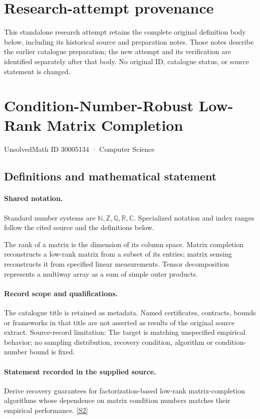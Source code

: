 \documentclass[11pt]{article}
\begin{document}
\section*{Research-attempt provenance}
This standalone research attempt retains the complete original definition body below,
including its historical source and preparation notes. Those notes describe the
earlier catalogue preparation; the new attempt and its verification are identified
separately after that body. No original ID, catalogue status, or source statement is changed.

\section{Condition-Number-Robust Low-Rank Matrix Completion}\label{30005134}
{\small UnsolvedMath ID 30005134 · Computer Science}
\subsection{Definitions and mathematical statement}

\paragraph{Shared notation.}Standard number systems are $\mathbb N,\mathbb Z,\mathbb Q,\mathbb R,\mathbb C$. Specialized notation and index ranges follow the cited source and the definitions below.


The rank of a matrix is the dimension of its column space. Matrix completion reconstructs a low-rank matrix from a subset of its entries; matrix sensing reconstructs it from specified linear measurements. Tensor decomposition represents a multiway array as a sum of simple outer products.
\paragraph{Record scope and qualifications.}
The catalogue title is retained as metadata. Named certificates, contracts, bounds or frameworks in that title are not asserted as results of the original source extract.
Source-record limitation: The target is matching unspecified empirical behavior; no sampling distribution, recovery condition, algorithm or condition-number bound is fixed.
\paragraph{Statement recorded in the supplied source.}
Derive recovery guarantees for factorization-based low-rank matrix-completion algorithms whose dependence on matrix condition numbers matches their empirical performance. \href{https://doi.org/10.4171/owr/2022/25}{[S2]}
\end{document}
